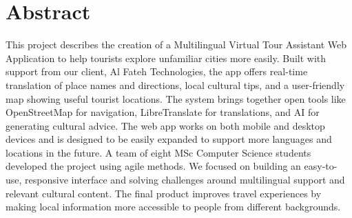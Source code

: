 \chapter*{Abstract}

This project describes the creation of a Multilingual Virtual Tour Assistant Web Application to help tourists explore unfamiliar cities more easily. Built with support from our client, Al Fateh Technologies, the app offers real-time translation of place names and directions, local cultural tips, and a user-friendly map showing useful tourist locations.
The system brings together open tools like OpenStreetMap for navigation, LibreTranslate for translations, and AI for generating cultural advice. The web app works on both mobile and desktop devices and is designed to be easily expanded to support more languages and locations in the future.
A team of eight MSc Computer Science students developed the project using agile methods. We focused on building an easy-to-use, responsive interface and solving challenges around multilingual support and relevant cultural content. The final product improves travel experiences by making local information more accessible to people from different backgrounds.
